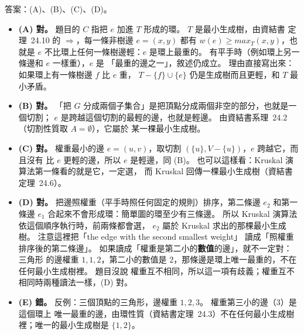 \begin{pastsoln}
答案：(A)、(B)、(C)、(D)。

\begin{itemize}
\item \textbf{(A) 對。} 題目的 $C$ 指把 $e$ 加進 $T$ 形成的環。 $T$ 是最小生成樹，由資結書
定理~24.10 的 $\Rightarrow$，每一條非樹邊 $e = (x, y)$ 都有 $w(e) \ge \mathit{max}_T(x, y)$，也就是
$e$ 不比環上任何一條樹邊輕：$e$ 是環上最重的。 有平手時（例如環上另一條邊和 $e$ 一樣重），$e$ 是
「最重的邊之一」，敘述仍成立。 理由直接寫出來：如果環上有一條樹邊 $f$ 比 $e$ 重，
$T - \{f\} \cup \{e\}$ 仍是生成樹而且更輕，和 $T$ 最小矛盾。
\item \textbf{(B) 對。} 「把 $G$ 分成兩個子集合」是把頂點分成兩個非空的部分，也就是一個切割；
$e$ 是跨越這個切割的最輕的邊，也就是輕邊。 由資結書系理~24.2（切割性質取 $A = \emptyset$），它屬於
某一棵最小生成樹。
\item \textbf{(C) 對。} 權重最小的邊 $e = (u, v)$，取切割 $(\{u\}, V - \{u\})$，$e$ 跨越它，而且沒有
比 $e$ 更輕的邊，所以 $e$ 是輕邊，同 (B)。 也可以這樣看：Kruskal 演算法第一條看的就是它，一定選，
而 Kruskal 回傳一棵最小生成樹（資結書定理~24.6）。
\item \textbf{(D) 對。} 把邊照權重（平手時照任何固定的規則）排序，第二條邊 $e_2$ 和第一條邊 $e_1$
合起來不會形成環：簡單圖的環至少有三條邊。 所以 Kruskal 演算法依這個順序執行時，前兩條都會選，
$e_2$ 屬於 Kruskal 求出的那棵最小生成樹。 注意這裡把「the edge with the second smallest weight」
讀成「照權重排序後的第二條邊」。 如果讀成「權重是第二小的\textbf{數值}的邊」，就不一定對：三角形
的邊權重 $1, 1, 2$，第二小的數值是 $2$，那條邊是環上唯一最重的，不在任何最小生成樹裡。 題目沒說
權重互不相同，所以這一項有歧義；權重互不相同時兩種讀法一樣，(D) 對。
\item \textbf{(E) 錯。} 反例：三個頂點的三角形，邊權重 $1, 2, 3$。 權重第三小的邊（$3$）是這個環上
唯一最重的邊，由環性質（資結書定理~24.3）不在任何最小生成樹裡；唯一的最小生成樹是 $\{1, 2\}$。
\end{itemize}
\end{pastsoln}
